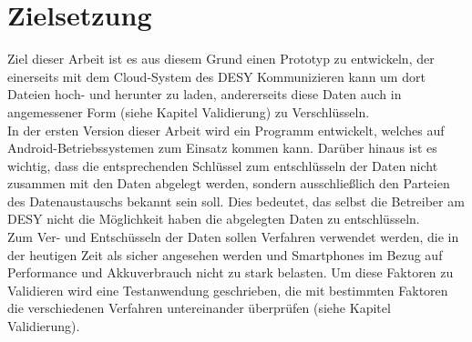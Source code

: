\documentclass[10pt, a4paper,headsepline]{scrreprt}
\begin{document}
\section{Zielsetzung}
Ziel dieser Arbeit ist es aus diesem Grund einen Prototyp zu entwickeln, der einerseits mit dem Cloud-System des DESY Kommunizieren kann um dort Dateien hoch- und herunter zu laden, andererseits diese Daten auch in angemessener Form (siehe Kapitel Validierung) zu Verschlüsseln. \\
In der ersten Version dieser Arbeit wird ein Programm entwickelt, welches auf Android-Betriebssystemen zum Einsatz kommen kann. Darüber hinaus ist es wichtig, dass die entsprechenden Schlüssel zum entschlüsseln der Daten nicht zusammen mit den Daten abgelegt werden, sondern ausschließlich den Parteien des Datenaustauschs bekannt sein soll. Dies bedeutet, das selbst die Betreiber am DESY nicht die Möglichkeit haben die abgelegten Daten zu entschlüsseln. \\
Zum Ver- und Entschüsseln der Daten sollen Verfahren verwendet werden, die in der heutigen Zeit als sicher angesehen werden und Smartphones im Bezug auf Performance und Akkuverbrauch nicht zu stark belasten. Um diese Faktoren zu Validieren wird eine Testanwendung geschrieben, die mit bestimmten Faktoren die verschiedenen Verfahren untereinander überprüfen (siehe Kapitel Validierung).



\end{document}
